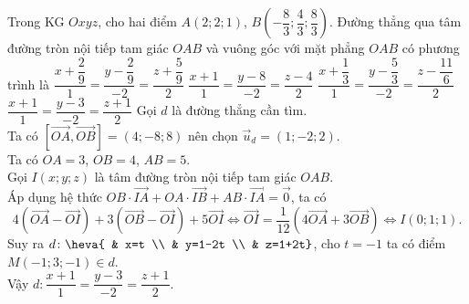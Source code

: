 \begin{ex}%
	Trong KG $Oxyz$, cho hai điểm $A(2;2;1)$, $B\left(-\dfrac{8}{3};\dfrac{4}{3};\dfrac{8}{3}\right)$. Đường thẳng qua tâm đường tròn nội tiếp tam giác $OAB$ và vuông góc với mặt phẳng $OAB$ có phương trình là
	\choice
	{$\dfrac{x+\dfrac{2}{9}}{1}=\dfrac{y-\dfrac{2}{9}}{-2}=\dfrac{z+\dfrac{5}{9}}{2}$}
	{$\dfrac{x+1}{1}=\dfrac{y-8}{-2}=\dfrac{z-4}{2}$}
	{$\dfrac{x+\dfrac{1}{3}}{1}=\dfrac{y-\dfrac{5}{3}}{-2}=\dfrac{z-\dfrac{11}{6}}{2}$}
	{\True $\dfrac{x+1}{1}=\dfrac{y-3}{-2}=\dfrac{z+1}{2}$}
	\loigiai
	{
		Gọi $d$ là đường thẳng cần tìm.\\
		Ta có $\left[\overrightarrow{OA},\overrightarrow{OB}\right]=(4;-8;8)$ nên chọn $\overrightarrow{u}_{d}=(1;-2;2)$.\\
		Ta có $OA=3$, $OB=4$, $AB=5$.\\
		Gọi $I(x;y;z)$ là tâm đường tròn nội tiếp tam giác $OAB$.\\
		Áp dụng hệ thức $OB\cdot\overrightarrow{IA}+OA\cdot\overrightarrow{IB}+AB\cdot\overrightarrow{IA}=\overrightarrow{0}$, ta có
		$$4\left(\overrightarrow{OA}-\overrightarrow{OI}\right)+3\left(\overrightarrow{OB}-\overrightarrow{OI}\right)+5\overrightarrow{OI}\Leftrightarrow \overrightarrow{OI}=\dfrac{1}{12}\left(4\overrightarrow{OA}+3\overrightarrow{OB}\right)\Leftrightarrow I(0;1;1).$$
		Suy ra $d\colon \heva{ & x=t \\ & y=1-2t \\ & z=1+2t}$, cho $t=-1$ ta có điểm $M(-1;3;-1)\in d$.\\
		Vậy $d\colon \dfrac{x+1}{1}=\dfrac{y-3}{-2}=\dfrac{z+1}{2}$.
	}
\end{ex}

